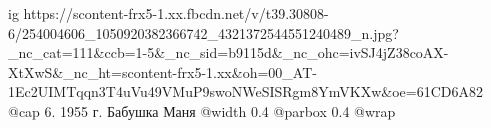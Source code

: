  
 
 
 
 

\ifcmt
  ig https://scontent-frx5-1.xx.fbcdn.net/v/t39.30808-6/254004606_1050920382366742_4321372544551240489_n.jpg?_nc_cat=111&ccb=1-5&_nc_sid=b9115d&_nc_ohc=ivSJ4jZ38coAX-XtXwS&_nc_ht=scontent-frx5-1.xx&oh=00_AT-1Ec2UIMTqqn3T4uVu49VMuP9swoNWeSISRgm8YmVKXw&oe=61CD6A82
  @cap 6. 1955 г. Бабушка Маня
  @width 0.4
  @parbox 0.4
  @wrap \parpic[r]
\fi
